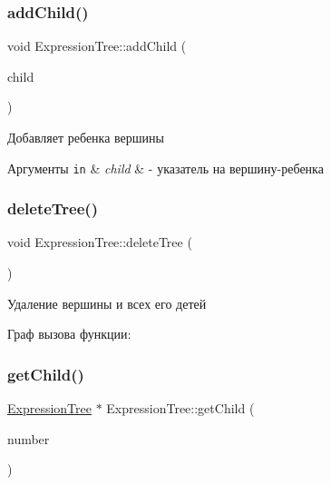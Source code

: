 \subsubsection{\texorpdfstring{add\+Child()}{addChild()}\hspace{0.1cm}{\footnotesize\ttfamily [2/2]}}
{\footnotesize\ttfamily void Expression\+Tree\+::add\+Child (\begin{DoxyParamCaption}\item[{\mbox{\hyperlink{class_expression_tree}{Expression\+Tree}} $\ast$}]{child }\end{DoxyParamCaption})}



Добавляет ребенка вершины 


\begin{DoxyParams}[1]{Аргументы}
\mbox{\tt in}  & {\em child} & -\/ указатель на вершину-\/ребенка \\
\hline
\end{DoxyParams}
\mbox{\label{class_expression_tree_a31b2699bd59541d9620fd0fbbdb1e994}} 
\subsubsection{\texorpdfstring{delete\+Tree()}{deleteTree()}}
{\footnotesize\ttfamily void Expression\+Tree\+::delete\+Tree (\begin{DoxyParamCaption}{ }\end{DoxyParamCaption})}



Удаление вершины и всех его детей 

Граф вызова функции\+:
\mbox{\label{class_expression_tree_a43f4d0121efe31c0258e5932007b928e}} 
\subsubsection{\texorpdfstring{get\+Child()}{getChild()}}
{\footnotesize\ttfamily \mbox{\hyperlink{class_expression_tree}{Expression\+Tree}} $\ast$ Expression\+Tree\+::get\+Child (\begin{DoxyParamCaption}\item[{int}]{number }\end{DoxyParamCaption})}



